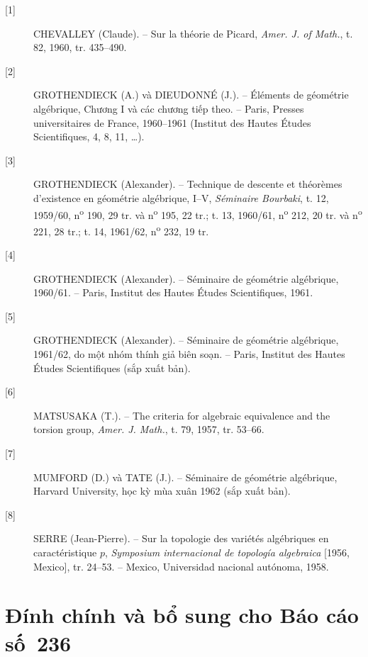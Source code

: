 \documentclass[11pt,twoside,openany]{book}
\numberwithin{equation}{section}
\newcommand{\src}[1]{%
  \phantomsection\hypertarget{src:\fgasourceid:#1}{}%
  \marginpar{\raggedleft\footnotesize\sffamily #1}%
}
\newcommand{\fgasourceid}{unset}
\newcommand{\sid}[1]{\gdef\fgasourceid{#1}\phantomsection\hypertarget{fga:#1}{}}
\begin{document}
\begin{description}
\item[{[1]}] CHEVALLEY (Claude). -- Sur la théorie de Picard,
\emph{Amer. J. of Math.}, t. 82, 1960, tr. 435--490.

\item[{[2]}] GROTHENDIECK (A.) và DIEUDONNÉ (J.). -- Éléments de géométrie
algébrique, Chương I và các chương tiếp theo. -- Paris, Presses universitaires
de France, 1960--1961 (Institut des Hautes Études Scientifiques, 4, 8, 11,
\ldots).

\item[{[3]}] GROTHENDIECK (Alexander). -- Technique de descente et théorèmes
d'existence en géométrie algébrique, I--V, \emph{Séminaire Bourbaki}, t. 12,
1959/60, n\textsuperscript{o} 190, 29 tr. và n\textsuperscript{o} 195, 22 tr.;
t. 13, 1960/61, n\textsuperscript{o} 212, 20 tr. và
n\textsuperscript{o} 221, 28 tr.; t. 14, 1961/62,
n\textsuperscript{o} 232, 19 tr.

\item[{[4]}] GROTHENDIECK (Alexander). -- Séminaire de géométrie algébrique,
1960/61. -- Paris, Institut des Hautes Études Scientifiques, 1961.

\item[{[5]}] GROTHENDIECK (Alexander). -- Séminaire de géométrie algébrique,
1961/62, do một nhóm thính giả biên soạn. -- Paris, Institut des Hautes Études
Scientifiques (sắp xuất bản).

\item[{[6]}] MATSUSAKA (T.). -- The criteria for algebraic equivalence and the
torsion group, \emph{Amer. J. Math.}, t. 79, 1957, tr. 53--66.

\item[{[7]}] MUMFORD (D.) và TATE (J.). -- Séminaire de géométrie algébrique,
Harvard University, học kỳ mùa xuân 1962 (sắp xuất bản).

\item[{[8]}] SERRE (Jean-Pierre). -- Sur la topologie des variétés algébriques
en caractéristique $p$, \emph{Symposium internacional de topología algebraica}
[1956, Mexico], tr. 24--53. -- Mexico, Universidad nacional autónoma, 1958.
\end{description}

\par

\clearpage
\chapter*{Đính chính và bổ sung cho Báo cáo số~236}
\sid{e236}
\src{303}
\end{document}
